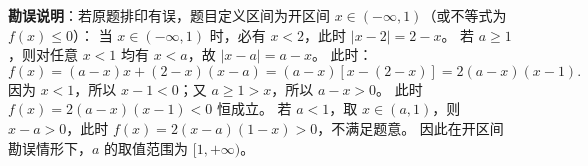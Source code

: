 \begin{answer}
\textbf{勘误说明}：若原题排印有误，题目定义区间为开区间 $x \in (-\infty, 1)$（或不等式为 $f(x) \leqslant 0$）：
当 $x \in (-\infty, 1)$ 时，必有 $x < 2$，此时 $|x - 2| = 2 - x$。
若 $a \geqslant 1$，则对任意 $x < 1$ 均有 $x < a$，故 $|x - a| = a - x$。
此时：
\nopagebreak[4]
\[f(x) = (a - x)x + (2 - x)(x - a) = (a - x)[x - (2 - x)] = 2(a - x)(x - 1).\]
因为 $x < 1$，所以 $x - 1 < 0$；又 $a \geqslant 1 > x$，所以 $a - x > 0$。
此时 $f(x) = 2(a - x)(x - 1) < 0$ 恒成立。
若 $a < 1$，取 $x \in (a, 1)$，则 $x - a > 0$，此时 $f(x) = 2(x - a)(1 - x) > 0$，不满足题意。
因此在开区间勘误情形下，$a$ 的取值范围为 $[1, +\infty)$。


\gkanswer{答案（2）：按原卷字面条件无解（$\varnothing$）；若勘误为开区间 $x \in (-\infty, 1)$ 则 $a$ 的取值范围为 $[1, +\infty)$}

\end{answer}